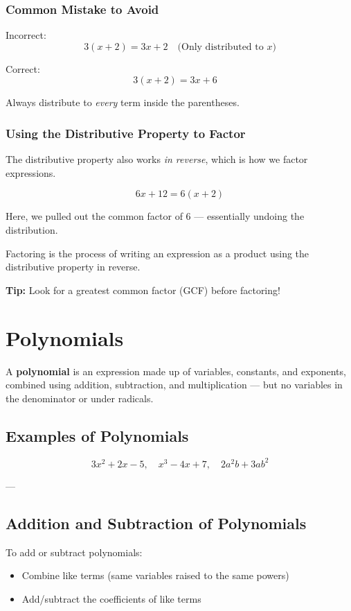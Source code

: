 \documentclass[11pt]{article}
\begin{document}
\subsubsection*{Common Mistake to Avoid}

Incorrect:
\[
3(x + 2) = 3x + 2 \quad \text{(Only distributed to } x \text{)}
\]

Correct:
\[
3(x + 2) = 3x + 6 \quad
\]

Always distribute to \textit{every} term inside the parentheses.

\subsubsection*{Using the Distributive Property to Factor}

The distributive property also works \textit{in reverse}, which is how we factor expressions.

\[
6x + 12 = 6(x + 2)
\]

Here, we pulled out the common factor of 6 — essentially undoing the distribution.

Factoring is the process of writing an expression as a product using the distributive property in reverse.

\textbf{Tip:} Look for a greatest common factor (GCF) before factoring!
\section{Polynomials}

A \textbf{polynomial} is an expression made up of variables, constants, and exponents, combined using addition, subtraction, and multiplication — but no variables in the denominator or under radicals.

\subsection*{Examples of Polynomials}

\[
3x^2 + 2x - 5, \quad x^3 - 4x + 7, \quad 2a^2b + 3ab^2
\]

---

\subsection{Addition and Subtraction of Polynomials}

To add or subtract polynomials:
\begin{itemize}
  \item Combine like terms (same variables raised to the same powers)
  \item Add/subtract the coefficients of like terms
\end{itemize}
\end{document}
